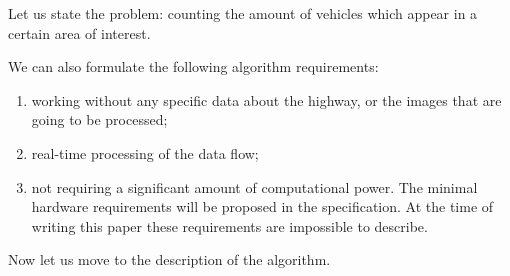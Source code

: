 \documentclass[12pt,a4paper,oneside,titlepage]{article}
\begin{document}
 



Let us state the problem: counting the amount of vehicles which appear in a certain area of interest.

We can also formulate the following algorithm requirements:
\begin{enumerate}
  \item working without any specific data about the highway, or the images that are going to be processed;
  \item real-time processing of the data flow;
  \item not requiring a significant amount of computational power. The minimal hardware requirements will be proposed in the specification. At the time of writing this paper these requirements are impossible to describe.
\end{enumerate}

Now let us move to the description of the algorithm.

































\newpage
\end{document}
